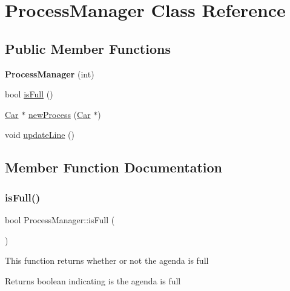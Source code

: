 \hypertarget{class_process_manager}{}\section{Process\+Manager Class Reference}
\label{class_process_manager}
\subsection*{Public Member Functions}
\begin{DoxyCompactItemize}
\item 
\mbox{\label{class_process_manager_a12ee59a496abcc1c88f17cd303282587}} 
{\bfseries Process\+Manager} (int)
\item 
bool \mbox{\hyperlink{class_process_manager_a207531dd7b8856cf5d1b538f97e14dd0}{is\+Full}} ()
\item 
\mbox{\hyperlink{class_car}{Car}} $\ast$ \mbox{\hyperlink{class_process_manager_a19e3e92e9da27c4f8cac960f444060c1}{new\+Process}} (\mbox{\hyperlink{class_car}{Car}} $\ast$)
\item 
void \mbox{\hyperlink{class_process_manager_a2f02ec25277925232289f75930d35a21}{update\+Line}} ()
\end{DoxyCompactItemize}


\subsection{Member Function Documentation}
\mbox{\label{class_process_manager_a207531dd7b8856cf5d1b538f97e14dd0}} 
\subsubsection{\texorpdfstring{isFull()}{isFull()}}
{\footnotesize\ttfamily bool Process\+Manager\+::is\+Full (\begin{DoxyParamCaption}{ }\end{DoxyParamCaption})}

This function returns whether or not the agenda is full \begin{DoxyReturn}{Returns}
boolean indicating is the agenda is full 
\end{DoxyReturn}
\mbox{\label{class_process_manager_a19e3e92e9da27c4f8cac960f444060c1}} 
